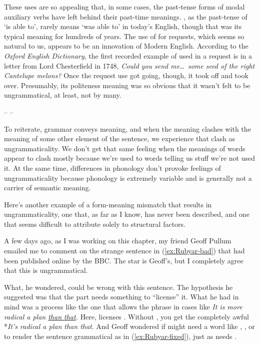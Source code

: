 These uses are so appealing that, in some cases, the past-tense forms of modal auxiliary verbs have left behind their past-time meanings. , as the past-tense of  `is able to', rarely means `was able to' in today's English, though that was its typical meaning for hundreds of years. The use of  for requests, which seems so natural to us, appears to be an innovation of Modern English. %
According to the \textit{Oxford English Dictionary}, the first recorded example of  used in a request is in a letter from Lord Chesterfield in 1748, \textit{Could you send me\dots~some seed of the right Cantelupe melons?} Once the request use got going, though, it took off and took over. Presumably, its politeness meaning was so obvious that it wasn't felt to be ungrammatical, at least, not by many.

\begin{center}
    -- --
\end{center}

To reiterate, grammar conveys meaning, and when the meaning clashes with the meaning of some other element of the sentence, we experience that clash as ungrammaticality. We don't get that same feeling when the meanings of words appear to clash mostly because we're used to words telling us stuff we're not used it. At the same time, differences in phonology don't provoke feelings of ungrammaticality because phonology is extremely variable and is generally not a carrier of semantic meaning.

Here's another example of a form-meaning mismatch that results in ungrammaticality, one that, as far as I know, has never been described, and one that seems difficult to attribute solely to structural factors.

A few days ago, as I was working on this chapter, my friend Geoff Pullum emailed me to comment on the strange sentence in (\ref{ex:Rubyar-bad}) that had been published online by the BBC. The star is Geoff's, but I completely agree that this is ungrammatical.

\label{ex:Rubyar-bad}
\z

What, he wondered, could be wrong with this sentence. The hypothesis he suggested was that the  part needs something to \enquote{license} it. What he had in mind was a process like the one that allows the  phrase in cases like \textit{It is more radical a plan \uline{than that}.} Here,  licenses . Without , you get the completely awful *\textit{It's radical a plan than that}. And Geoff wondered if  might need a word like , , or  to render the sentence grammatical as in (\ref{ex:Rubyar-fixed}), just as  needs .

